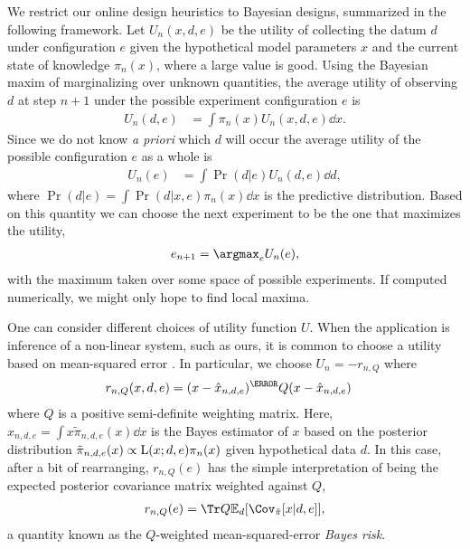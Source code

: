 \documentclass[aps,nofootinbib,twocolumn,superscriptaddress]{revtex4}
\newcommand{\mps}{x}
\newcommand{\eps}{e}
\newcommand{\data}{d}
\begin{document}
We restrict our online design heuristics to Bayesian designs,
summarized in the following framework.
Let $U_n(\mps,\data,\eps)$ be the utility of collecting the datum
$\data$ under configuration $\eps$ given the hypothetical
model parameters $\mps$ and the current state of knowledge $\pi_n(\mps)$,
where a large value is good.
Using the Bayesian maxim of marginalizing over unknown quantities,
the average utility of observing $\data$ at step $n+1$ under
the possible experiment configuration $\eps$ is
\begin{align}
    U_n(\data,\eps)
        &= \int \pi_n(\mps)U_n(\mps,\data,\eps)\dd\mps.
\end{align}
Since we do not know \textit{a priori} which $\data$ will
occur the average utility of the possible configuration $\eps$ as a whole is
\begin{align}
    U_n(\eps)
        &= \int\Pr(\data|\eps)U_n(\data,\eps) \dd\data,
\end{align}
where $\Pr(\data|\eps)=\int \Pr(\data|\mps,\eps)\pi_n(\mps)\dd\mps$ is the
predictive distribution.
Based on this quantity we can choose the next experiment to be
the one that maximizes the utility,
\begin{align}
    \eps_{n+1} = \argmax_\eps U_n(\eps),
\end{align}
with the maximum taken over some space of possible experiments.
If computed numerically, we might only hope to find local maxima.

One can consider different choices of utility function $U$.
When the application is inference of a non-linear system, such as
ours, it is common to choose a utility based on
mean-squared error \cite{chaloner_bayesian_1995}.
In particular, we choose $U_n=-r_{n,Q}$ where
\begin{align}
    r_{n,Q}(\mps,\data,\eps)
        &= (\mps - \hat\mps_{n,\data,\eps})^\T Q (\mps - \hat\mps_{n,\data,\eps})
\end{align}
where $Q$ is a positive semi-definite weighting matrix.
Here, $\hat{\mps}_{n,\data,\eps}=\int \mps \tilde{\pi}_{n,\data,\eps}(\mps)\dd\mps$
is the Bayes estimator of $\mps$ based on the posterior distribution
$\tilde{\pi}_{n,\data,\eps}(\mps)\propto \Lhood(\mps;\data,\eps)\pi_n(\mps)$
given hypothetical data $\data$.
In this case, after a bit of rearranging,
$r_{n,Q}(\eps)$ has the simple interpretation
of being the expected posterior covariance matrix weighted
against $Q$,
\begin{align}
    r_{n,Q}(\eps) = \Tr Q\expect_\data[\Cov_{\tilde{\pi}}
        [\mps|\data,\eps]],
    \label{eq:bayes-risk}
\end{align}
a quantity known as the $Q$-weighted
mean-squared-error \textit{Bayes risk}.
\end{document}
